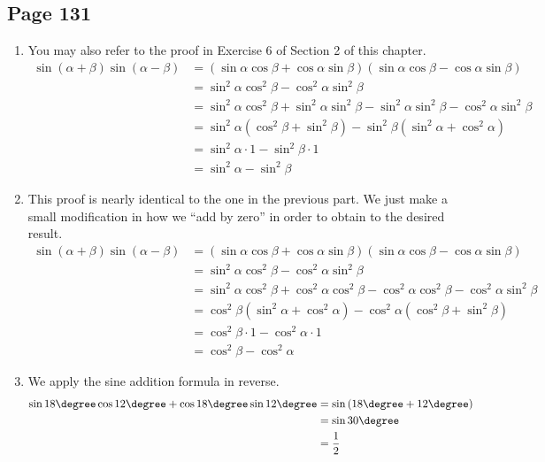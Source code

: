 \documentclass{article}
\newenvironment{solutions}[1]
{\subsection*{#1}
 \begin{enumerate}[leftmargin=1.5em]}
{\end{enumerate}}
\newcommand{\solution}{\item}
\begin{document}
\begin{solutions}{Page 131}
\solution %
You may also refer to the proof in Exercise 6 of Section 2 of this chapter.
\begin{align*}
\sin\left(\alpha+\beta\right)\sin\left(\alpha-\beta\right) &= \left(\sin{\alpha}\cos{\beta} + \cos{\alpha}\sin{\beta}\right)\left(\sin{\alpha}\cos{\beta} - \cos{\alpha}\sin{\beta}\right)\\
&= \sin^{2}{\alpha}\cos^{2}{\beta} - \cos^{2}{\alpha}\sin^{2}{\beta} \\
&= \sin^{2}{\alpha}\cos^{2}{\beta} + \sin^{2}{\alpha}\sin^{2}{\beta} - \sin^{2}{\alpha}\sin^{2}{\beta} - \cos^{2}{\alpha}\sin^{2}{\beta} \\
&= \sin^{2}{\alpha}\left(\cos^{2}{\beta} + \sin^{2}{\beta}\right) - \sin^{2}{\beta}\left(\sin^{2}{\alpha} + \cos^{2}{\alpha}\right) \\
&= \sin^{2}{\alpha} \cdot 1 - \sin^2{\beta} \cdot 1 \\
&= \sin^{2}{\alpha} - \sin^2{\beta}
\end{align*}

\solution %
This proof is nearly identical to the one in the previous part. We just make a small modification in how we ``add by zero'' in order to obtain to the desired result.
\begin{align*}
\sin\left(\alpha+\beta\right)\sin\left(\alpha-\beta\right) &= \left(\sin{\alpha}\cos{\beta} + \cos{\alpha}\sin{\beta}\right)\left(\sin{\alpha}\cos{\beta} - \cos{\alpha}\sin{\beta}\right)\\
&= \sin^{2}{\alpha}\cos^{2}{\beta} - \cos^{2}{\alpha}\sin^{2}{\beta} \\
&= \sin^{2}{\alpha}\cos^{2}{\beta} + \cos^{2}{\alpha}\cos^{2}{\beta} - \cos^{2}{\alpha}\cos^{2}{\beta} - \cos^{2}{\alpha}\sin^{2}{\beta} \\
&= \cos^{2}{\beta}\left(\sin^{2}{\alpha} + \cos^{2}{\alpha}\right) - \cos^{2}{\alpha}\left(\cos^{2}{\beta} + \sin^{2}{\beta}\right) \\
&= \cos^{2}{\beta} \cdot 1 - \cos^2{\alpha} \cdot 1 \\
&= \cos^{2}{\beta} - \cos^2{\alpha}
\end{align*}

\solution %
We apply the sine addition formula in reverse.
\begin{align*}
\sin{18\degree}\cos{12\degree} + \cos{18\degree}\sin{12\degree} &= \sin\left(18\degree + 12\degree\right) \\
&= \sin{30\degree} \\
&= \dfrac{1}{2}
\end{align*}


\end{solutions}
\end{document}
